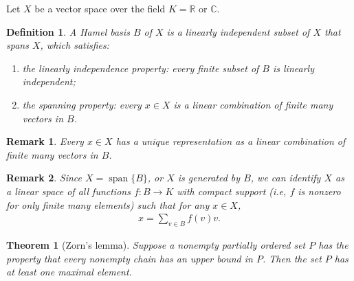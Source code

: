 \documentclass[10pt]{book}
\newtheorem{definition}{Definition}[chapter]
\newtheorem{theorem}{Theorem}[chapter]
\newtheorem{remark}{Remark}[chapter]
\theoremstyle{definition}
\numberwithin{equation}{chapter}
\begin{document}
Let $X$ be a vector space over the field $K = \mathbb{R}$ or $\mathbb{C}$.

\medskip

\begin{definition}
A Hamel basis $B$ of $X$ is a linearly independent subset of $X$ that spans $X$, which satisfies:
\begin{enumerate}[label=(\alph*)]
    \item the linearly independence property: every finite subset of $B$ is linearly independent;
    
    \item the spanning property: every $x \in X$ is a linear combination of finite many vectors in $B$.
\end{enumerate}
\end{definition}

\begin{remark}
Every $x \in X$ has a unique representation as a linear combination of finite many vectors in $B$.
\end{remark}


\begin{remark}
Since $X = \operatorname{span} \{B\}$, or $X$ is generated by $B$, we can identify $X$ as a linear space of all functions $f: B \to K$ with compact support (i.e, $f$ is nonzero for only finite many elements) such that for any $x \in X$,
\begin{align*}
    x = \sum_{v \in B} f(v) v.
\end{align*}
\end{remark}

\medskip

\begin{theorem}[Zorn's lemma]\label{th_157}
Suppose a nonempty partially ordered set $P$ has the property that every nonempty chain has an upper bound in $P$. Then the set $P$ has at least one maximal element.
\end{theorem}

\medskip
\end{document}
